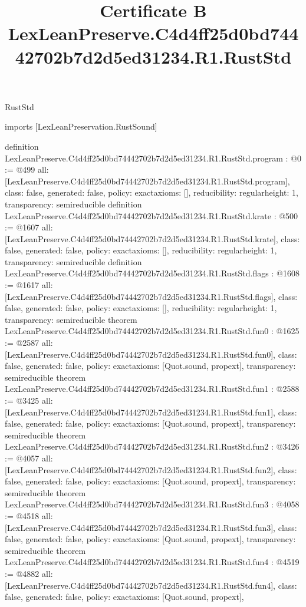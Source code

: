 \begin{lexlean}{RustStd}
\title{Certificate B LexLeanPreserve.C4d4ff25d0bd74442702b7d2d5ed31234.R1.RustStd}
\begin{coremodule}
imports [LexLeanPreservation.RustSound]

definition LexLeanPreserve.C4d4ff25d0bd74442702b7d2d5ed31234.R1.RustStd.program : @0 := @499 {
  all: [LexLeanPreserve.C4d4ff25d0bd74442702b7d2d5ed31234.R1.RustStd.program],
  class: false,
  generated: false,
  policy: exact{axioms: []},
  reducibility: regular{height: 1},
  transparency: semireducible
}
definition LexLeanPreserve.C4d4ff25d0bd74442702b7d2d5ed31234.R1.RustStd.krate : @500 := @1607 {
  all: [LexLeanPreserve.C4d4ff25d0bd74442702b7d2d5ed31234.R1.RustStd.krate],
  class: false,
  generated: false,
  policy: exact{axioms: []},
  reducibility: regular{height: 1},
  transparency: semireducible
}
definition LexLeanPreserve.C4d4ff25d0bd74442702b7d2d5ed31234.R1.RustStd.flags : @1608 := @1617 {
  all: [LexLeanPreserve.C4d4ff25d0bd74442702b7d2d5ed31234.R1.RustStd.flags],
  class: false,
  generated: false,
  policy: exact{axioms: []},
  reducibility: regular{height: 1},
  transparency: semireducible
}
theorem LexLeanPreserve.C4d4ff25d0bd74442702b7d2d5ed31234.R1.RustStd.fun0 : @1625 := @2587 {
  all: [LexLeanPreserve.C4d4ff25d0bd74442702b7d2d5ed31234.R1.RustStd.fun0],
  class: false,
  generated: false,
  policy: exact{axioms: [Quot.sound, propext]},
  transparency: semireducible
}
theorem LexLeanPreserve.C4d4ff25d0bd74442702b7d2d5ed31234.R1.RustStd.fun1 : @2588 := @3425 {
  all: [LexLeanPreserve.C4d4ff25d0bd74442702b7d2d5ed31234.R1.RustStd.fun1],
  class: false,
  generated: false,
  policy: exact{axioms: [Quot.sound, propext]},
  transparency: semireducible
}
theorem LexLeanPreserve.C4d4ff25d0bd74442702b7d2d5ed31234.R1.RustStd.fun2 : @3426 := @4057 {
  all: [LexLeanPreserve.C4d4ff25d0bd74442702b7d2d5ed31234.R1.RustStd.fun2],
  class: false,
  generated: false,
  policy: exact{axioms: [Quot.sound, propext]},
  transparency: semireducible
}
theorem LexLeanPreserve.C4d4ff25d0bd74442702b7d2d5ed31234.R1.RustStd.fun3 : @4058 := @4518 {
  all: [LexLeanPreserve.C4d4ff25d0bd74442702b7d2d5ed31234.R1.RustStd.fun3],
  class: false,
  generated: false,
  policy: exact{axioms: [Quot.sound, propext]},
  transparency: semireducible
}
theorem LexLeanPreserve.C4d4ff25d0bd74442702b7d2d5ed31234.R1.RustStd.fun4 : @4519 := @4882 {
  all: [LexLeanPreserve.C4d4ff25d0bd74442702b7d2d5ed31234.R1.RustStd.fun4],
  class: false,
  generated: false,
  policy: exact{axioms: [Quot.sound, propext]},
}
\end{coremodule}
\end{lexlean}
